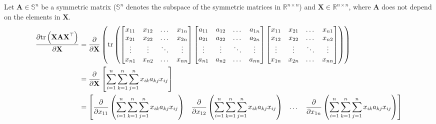 \documentclass{article}
\newcommand{\tr}[1]{\ensuremath{\textnormal{tr}\left(#1\right)}} %
\begin{document}
Let \(\mathbf{A} \in \mathbb{S}^{n}\) be a symmetric matrix (\(\mathbb{S}^{n}\) denotes the subspace of the symmetric matrices in \(\mathbb{R}^{n\times n}\)) and \(\mathbf{X} \in \mathbb{R}^{n\times n}\), where \(\mathbf{A}\) does not depend on the elements in \(\mathbf{X}\).
\begin{align*}
    \dfrac{\partial \textnormal{tr}\left(\mathbf{XAX}^\top\right)}{\partial \mathbf{X}} &= \dfrac{\partial}{\partial \mathbf{X}} \left(
    \tr{
        \begin{bmatrix}
            x_{11} & x_{12} & \dots & x_{1n} \\
            x_{21} & x_{22} & \dots & x_{2n} \\
            \vdots & \vdots & \ddots & \vdots \\
            x_{n1} & x_{n2} & \dots & x_{nn} \\
        \end{bmatrix}
        \begin{bmatrix}
            a_{11} & a_{12} & \dots & a_{1n} \\
            a_{21} & a_{22} & \dots & a_{2n} \\
            \vdots & \vdots & \ddots & \vdots \\
            a_{n1} & a_{n2} & \dots & a_{nn} \\
        \end{bmatrix}
    \begin{bmatrix}
        x_{11} & x_{21} & \dots & x_{n1} \\
        x_{12} & x_{22} & \dots & x_{n2} \\
        \vdots & \vdots & \ddots & \vdots \\
        x_{1n} & x_{2n} & \dots & x_{nn} \\
    \end{bmatrix} \right)} \\
    &= \dfrac{\partial}{\partial \mathbf{X}} \left[ \sum_{i = 1}^{n} \sum_{k = 1}^{n} \sum_{j = 1}^{n} x_{ik}a_{kj}x_{ij} \right] \\
    &= \begin{bmatrix}
        \displaystyle \dfrac{\partial}{\partial x_{11}} \left( \sum_{i = 1}^{n} \sum_{k = 1}^{n} \sum_{j = 1}^{n} x_{ik}a_{kj}x_{ij} \right) & 
        \displaystyle \dfrac{\partial}{\partial x_{12}} \left( \sum_{i = 1}^{n} \sum_{k = 1}^{n} \sum_{j = 1}^{n} x_{ik}a_{kj}x_{ij} \right) & 
        \dots & 
        \displaystyle \dfrac{\partial}{\partial x_{1n}} \left( \sum_{i = 1}^{n} \sum_{k = 1}^{n} \sum_{j = 1}^{n} x_{ik}a_{kj}x_{ij} \right) \\

\end{bmatrix}
\end{align*}
\end{document}
